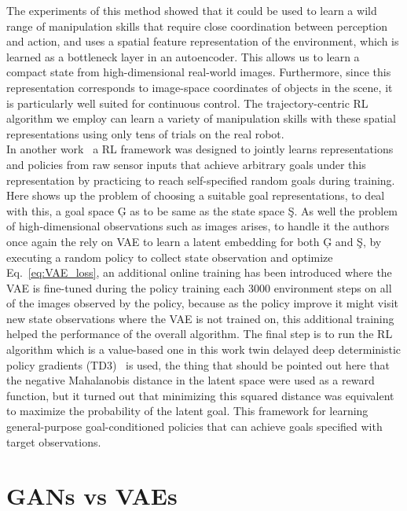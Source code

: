 The experiments of this method showed that it could be used to learn a wild range of manipulation skills that require close coordination between perception and
action, and uses a spatial feature representation of the environment, which is learned as a bottleneck layer in
an autoencoder. This allows us to learn a compact state from high-dimensional real-world images. Furthermore, since this
representation corresponds to image-space coordinates of objects in the scene, it is particularly well suited for continuous control. The trajectory-centric RL algorithm we employ can learn a variety of manipulation skills with these spatial
representations using only tens of trials on the real robot.\\

In another work~\cite{nair2018visual} a RL framework was designed to jointly learns representations and policies from raw sensor inputs that achieve arbitrary goals under this representation by practicing to reach self-specified random goals during training. Here shows up the problem of choosing a suitable goal representations, to deal with this, a goal space \c{G} as to be same as the state space \c{S}. As well the problem of high-dimensional observations such as images arises, to handle it the authors once again the rely on VAE to learn a latent embedding for both \c{G} and \c{S}, by executing a random policy to collect state observation and optimize Eq.~\ref{eq:VAE_loss}, an additional online training has been introduced where the VAE is fine-tuned during the policy training each 3000 environment steps on all of the images observed by the policy, because as the policy improve it might visit new state observations where the VAE is not trained on, this additional training helped the performance of the overall algorithm. The final step is to run the RL algorithm which is a value-based one in this work twin delayed deep deterministic
policy gradients (TD3)~\cite{fujimoto2018addressing} is used, the thing that should be pointed out here that the negative Mahalanobis distance in the latent space were used as a reward function, but it turned out that minimizing this squared distance was equivalent to maximize the probability of the latent goal. This framework for learning general-purpose goal-conditioned policies that can achieve goals specified with target observations.\\


\section{GANs vs VAEs}

